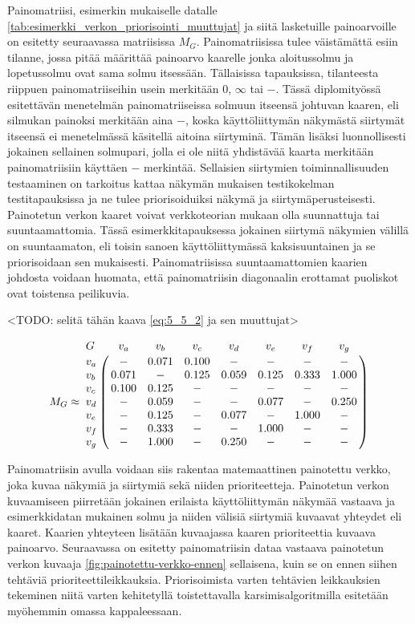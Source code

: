   Painomatriisi, esimerkin mukaiselle datalle \ref{tab:esimerkki_verkon_priorisointi_muuttujat} ja siitä lasketuille painoarvoille on esitetty seuraavassa matriisissa \(M_G\).
  Painomatriisissa tulee väistämättä esiin tilanne, jossa pitää määrittää painoarvo kaarelle jonka aloitussolmu ja lopetussolmu ovat sama solmu itsessään.
  Tällaisissa tapauksissa, tilanteesta riippuen painomatriiseihin usein merkitään \(0\), \(\infty\) tai \(-\).
  Tässä diplomityössä esitettävän menetelmän painomatriiseissa solmuun itseensä johtuvan kaaren, eli silmukan painoksi merkitään aina \(-\), koska käyttöliittymän näkymästä siirtymät itseensä ei menetelmässä käsitellä aitoina siirtyminä.
  Tämän lisäksi luonnollisesti jokainen sellainen solmupari, jolla ei ole niitä yhdistävää kaarta merkitään painomatriisiin käyttäen \(-\) merkintää.
  Sellaisien siirtymien toiminnallisuuden testaaminen on tarkoitus kattaa näkymän mukaisen testikokelman testitapauksissa ja ne tulee priorisoiduiksi näkymä ja siirtymäperusteisesti.
  Painotetun verkon kaaret voivat verkkoteorian mukaan olla suunnattuja tai suuntaamattomia.
  Tässä esimerkkitapauksessa jokainen siirtymä näkymien välillä on suuntaamaton, eli toisin sanoen käyttöliittymässä kaksisuuntainen ja se priorisoidaan sen mukaisesti.
  Painomatriisissa suuntaamattomien kaarien johdosta voidaan huomata, että painomatriisin diagonaalin erottamat puoliskot ovat toistensa peilikuvia.

  <TODO: selitä tähän kaava \ref{eq:5_5_2} ja sen muuttujat>

   \begin{equation} \label{eq:5_5_2}
    M_G \approx
    \bordermatrix{
      G   & v_a   & v_b   & v_c   & v_d   & v_e   & v_f   & v_g   \cr
      v_a & -     & 0.071 & 0.100 & -     & -     & -     & -     \cr
      v_b & 0.071 & -     & 0.125 & 0.059 & 0.125 & 0.333 & 1.000 \cr
      v_c & 0.100 & 0.125 & -     & -     & -     & -     & -     \cr
      v_d & -     & 0.059 & -     & -     & 0.077 & -     & 0.250 \cr
      v_e & -     & 0.125 & -     & 0.077 & -     & 1.000 & -     \cr
      v_f & -     & 0.333 & -     & -     & 1.000 & -     & -     \cr
      v_g & -     & 1.000 & -     & 0.250 & -     & -     & -     \cr
    }
   \end{equation}

  Painomatriisin avulla voidaan siis rakentaa matemaattinen painotettu verkko, joka kuvaa näkymiä ja siirtymiä sekä niiden prioriteetteja.
  Painotetun verkon kuvaamiseen piirretään jokainen erilaista käyttöliittymän näkymää vastaava ja esimerkkidatan mukainen solmu ja niiden välisiä siirtymiä kuvaavat yhteydet eli kaaret.
  Kaarien yhteyteen lisätään kuvaajassa kaaren prioriteettia kuvaava painoarvo.
  Seuraavassa on esitetty painomatriisin dataa vastaava painotetun verkon kuvaaja \ref{fig:painotettu-verkko-ennen} sellaisena, kuin se on ennen siihen tehtäviä prioriteettileikkauksia.
  Priorisoimista varten tehtävien leikkauksien tekeminen niitä varten kehitetyllä toistettavalla karsimisalgoritmilla esitetään myöhemmin omassa kappaleessaan.

